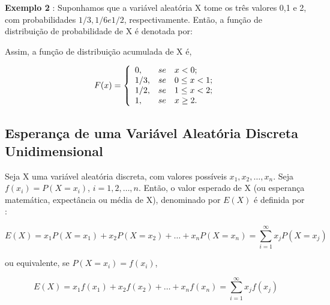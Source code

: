 \documentclass[a4paper,12pt]{report}
\begin{document}
{\textbf{Exemplo 2} : Suponhamos que a variável aleatória X tome os
três valores 0,1 e 2, com probabilidades $1/3, 1/6 e 1/2$,
respectivamente. Então, a função de distribuição de probabilidade
de X é denotada por:


\begin{table}[!htb]
\end{table}

Assim, a função de distribuição acumulada de X é,

$$
F(x)=
\left\{%
\begin{array}{ll}
   0   , & se \quad \hbox{$x < 0$;} \\
   1/3 , & se \quad \hbox{$0 \leq x < 1$;} \\
   1/2 , & se \quad \hbox{$1 \leq x < 2$;} \\
   1   , & se \quad \hbox{$x \geq 2$.} \\
\end{array}%
\right.
$$



\subsection{Esperança de uma Variável Aleatória Discreta Unidimensional}

Seja X uma variável aleatória discreta, com valores possíveis
$x_{1},x_{2},\ldots,x_{n}$. Seja $ f(x_{i})= P(X=x_{i})$,
$i=1,2,\ldots,n$. Então, o valor esperado de X (ou esperança
matemática, expectância ou média de X), denominado por $E(X)$ é
definida por :


\begin{equation}\label{e(x)}
    E(X) = x_{1}P(X=x_{1})+x_{2}P(X=x_{2})+\ldots+x_{n}P(X=x_{n})= \sum_{i=1}^{\infty} x_{j}P(X=x_{j})
\end{equation}

ou equivalente, se $P(X=x_{i})=f(x_{i})$,


\begin{equation}\label{e(x)}
    E(X) = x_{1}f(x_{1})+x_{2}f(x_{2})+\ldots+x_{n}f(x_{n})= \sum_{i=1}^{\infty} x_{j}f(x_{j})
\end{equation}


}
\end{document}
